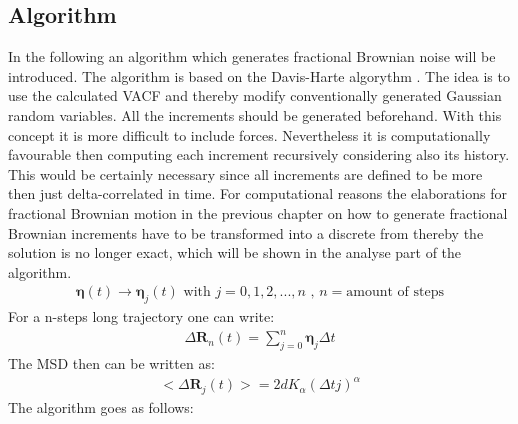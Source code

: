 \documentclass[
  a4paper,BCOR10mm,oneside,
  bibtotoc,idxtotoc,
  headsepline,footsepline,%
  fleqn,openbib
]{scrbook}
\begin{document}
\subsection{Algorithm}
In the following an algorithm which generates fractional Brownian noise will be introduced. The algorithm is based on the Davis-Harte algorythm \cite{Craigmile2003}. The idea is to use the calculated VACF and thereby modify conventionally generated Gaussian random variables.  All the increments should be generated beforehand. With this concept it is more difficult to include forces. Nevertheless it is computationally favourable then computing each increment recursively considering also its history. This would be certainly necessary since all increments are defined to be more then just delta-correlated in time. For computational reasons the elaborations for fractional Brownian motion in the previous chapter on how to generate fractional Brownian increments have to be transformed into a discrete from thereby the solution is no longer exact, which will be shown in the analyse part of the algorithm.   
\begin{align}
\bm{\eta} (t) \longrightarrow \bm{\eta}_j(t)  \text{  with  } j=0,1,2,...,n  \text{  ,  } n= \text{amount of steps}
\end{align}
For a n-steps long trajectory one can write:
\begin{align}
 \Delta \bm{R}_n(t) =  \sum_{j=0}^n \bm{\eta}_j  \Delta t \label{eq:diskretdeltar}
\end{align}
 The MSD then can be written as:
\begin{align}
< \Delta \bm{R}_{j}(t)>=2dK_{\alpha} (\Delta t j)^{\alpha}
\end{align}
The algorithm goes as follows:
\end{document}
